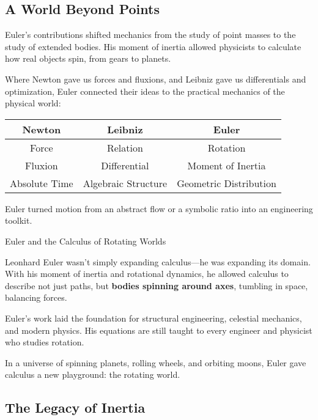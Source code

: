 \subsection{A World Beyond Points}

Euler’s contributions shifted mechanics from the study of point masses to the study of extended bodies. His 
moment of inertia allowed physicists to calculate how real objects spin, from gears to planets.

Where Newton gave us forces and fluxions, and Leibniz gave us differentials and optimization, Euler connected 
their ideas to the practical mechanics of the physical world:

\begin{center}
\begin{tabular}{c|c|c}
\textbf{Newton} & \textbf{Leibniz} & \textbf{Euler} \\
\hline
Force & Relation & Rotation \\
Fluxion & Differential & Moment of Inertia \\
Absolute Time & Algebraic Structure & Geometric Distribution \\
\end{tabular}
\end{center}

Euler turned motion from an abstract flow or a symbolic ratio into an engineering toolkit.

\begin{HistoricalSidebar}{Euler and the Calculus of Rotating Worlds}
  
Leonhard Euler wasn’t simply expanding calculus—he was expanding its domain. With his moment of inertia 
and rotational dynamics, he allowed calculus to describe not just paths, but \textbf{bodies spinning around axes}, 
tumbling in space, balancing forces.

\medskip

Euler’s work laid the foundation for structural engineering, celestial mechanics, and modern physics. His 
equations are still taught to every engineer and physicist who studies rotation.

\medskip

In a universe of spinning planets, rolling wheels, and orbiting moons, Euler gave calculus a new playground: 
the rotating world.

\end{HistoricalSidebar}

\subsection{The Legacy of Inertia}

